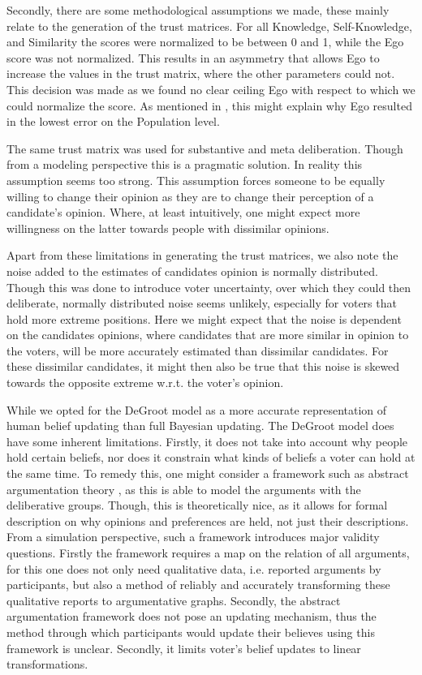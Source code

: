 Secondly, there are some methodological assumptions we made, these mainly
relate to the generation of the trust matrices. For all Knowledge,
Self-Knowledge, and Similarity the scores were normalized to be between 0 and
1, while the Ego score was not normalized. This results in an asymmetry that
allows Ego to increase the values in the trust matrix, where the other
parameters could not. This decision was made as we found no clear ceiling Ego
with respect to which we could normalize the score. As mentioned in ,
this might explain why Ego resulted in the lowest error on the Population level.

The same trust matrix was used for substantive and meta deliberation. Though
from a modeling perspective this is a pragmatic solution. In reality this
assumption seems too strong. This assumption forces someone to be equally
willing to change their opinion as they are to change their perception of a
candidate's opinion. Where, at least intuitively, one might expect more
willingness on the latter towards people with dissimilar opinions.


Apart from these limitations in generating the trust matrices, we also note the
noise added to the estimates of candidates opinion is normally distributed.
Though this was done to introduce voter uncertainty, over which they could then
deliberate, normally distributed noise seems unlikely, especially for voters
that hold more extreme positions. Here we might expect that the noise is
dependent on the candidates opinions, where candidates that are more similar in
opinion to the voters, will be more accurately estimated than dissimilar
candidates. For these dissimilar candidates, it might then also be true that
this noise is skewed towards the opposite extreme w.r.t. the voter's opinion.

While we opted for the DeGroot model as a more accurate representation of human
belief updating than full Bayesian updating. The DeGroot model does have some
inherent limitations. Firstly, it does not take into account why people hold
certain beliefs, nor does it constrain what kinds of beliefs a voter can hold
at the same time. To remedy this, one might consider a framework such as
abstract argumentation theory \citet{dungAcceptabilityArgumentsIts1995}, as
this is able to model the arguments with the deliberative groups. Though, this
is theoretically nice, as it allows for formal description on why opinions and
preferences are held, not just their descriptions. From a simulation
perspective, such a framework introduces major validity questions. Firstly the
framework requires a map on the relation of all arguments, for this one does
not only need qualitative data, i.e. reported arguments by participants, but
also a method of reliably and accurately transforming these qualitative reports
to argumentative graphs. Secondly, the abstract argumentation framework does
not pose an updating mechanism, thus the method through which participants
would update their believes using this framework is unclear. Secondly, it limits
voter's belief updates to linear transformations.



